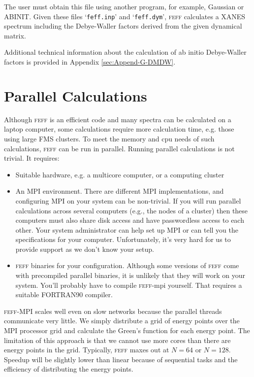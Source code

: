 \documentclass[11pt,oneside]{report} %
\newcommand{\program}[1]{\textsc{#1}}
\newcommand{\feff}{\program{feff}}
\newcommand{\file}[1]{`\texttt{#1}'}
\begin{document}
The user must obtain this file using another program, for example, Gaussian or ABINIT.  Given these files \file{feff.inp} and \file{feff.dym}, {\feff} calculates a XANES spectrum including the Debye-Waller factors derived from the given dynamical matrix.

Additional technical information about the calculation of ab initio Debye-Waller factors is provided in Appendix \ref{sec:Append-G-DMDW}.





\section{Parallel Calculations}
\label{Sec:Parallel}
Although {\feff} is an efficient code and many spectra can be calculated on a laptop computer, some calculations require more calculation time, e.g. those using large FMS clusters.  To meet the memory and cpu needs of such calculations, {\feff} can be run in parallel.  Running parallel calculations is not trivial.  It requires:
\begin{itemize}
  \item  Suitable hardware, e.g. a multicore computer, or a computing cluster
  \item  An MPI environment.  There are different MPI implementations, and configuring MPI on your system can be non-trivial.  If you will run parallel calculations across several computers (e.g., the nodes of a cluster) then these computers must also share disk access and have passwordless access to each other.  Your system administrator can help set up MPI or can tell you the specifications for your computer.  Unfortunately, it's very hard for us to provide support as we don't know your setup.
  \item {\feff} binaries for your configuration.  Although some versions of {\feff} come with precompiled parallel binaries, it is unlikely that they will work on your system.  You'll probably have to compile {\feff}-mpi yourself.  That requires a suitable FORTRAN90 compiler.
  \end{itemize}
  
{\feff}-MPI scales well even on slow networks because the parallel threads communicate very little.  We simply distribute a grid of energy points over the MPI processor grid and calculate the Green's function for each energy point.  The limitation of this approach is that we cannot use more cores than there are energy points in the grid.  Typically, {\feff} maxes out at $N=64$ or $N=128$.  Speedup will be slightly lower than linear because of sequential tasks and the efficiency of distributing the energy points.
\end{document}
